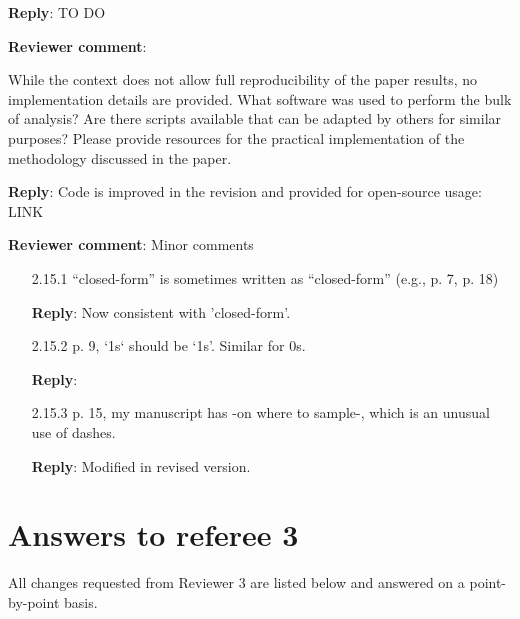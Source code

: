 \documentclass[a4paper]{article}
\newcounter{reviewer}
\def\revcom{\textbf{Reviewer comment}}
\def\reply{\textbf{Reply}}
\begin{document}
\begin{answers}
\reply: TO DO

\item{\revcom :}\label{r2c14}

While the context does not allow full reproducibility of the paper results, no implementation details are provided. What software was used to perform the bulk of analysis? Are there scripts available that can be adapted by others for similar purposes? Please provide resources for the practical implementation of the methodology discussed in the paper.

\reply: Code is improved in the revision and provided for open-source usage: LINK 

\item{\revcom: Minor comments}\label{r2cminor}

\begin{itemize}[noitemsep,topsep=0pt,parsep=0pt,partopsep=0pt]

\item[2.15.1] “closed-form” is sometimes written as “closed-form” (e.g., p. 7, p. 18)

\reply: Now consistent with 'closed-form'.

\item[2.15.2] p. 9, `1s` should be ‘1s’. Similar for 0s.

\reply:

\item[2.15.3] p. 15, my manuscript has -on where to sample-, which is an unusual use of dashes.

\reply: Modified in revised version.

\end{itemize}

\end{answers}

\section*{Answers to referee 3}
All changes requested from Reviewer 3 are listed below and answered on a point-by-point basis.

\setcounter{reviewer}{3}
\end{document}
